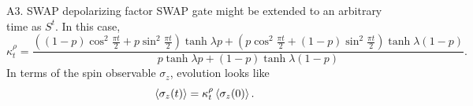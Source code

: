\begin{frame}{A3. SWAP depolarizing factor}
    SWAP gate might be extended to an arbitrary time as $S^{t}$. In this case, 
    \begin{equation*}
        \kappa_{t}^{\rho}=\frac{((1-p)\cos^{2}{\frac{\pi t}{2}}+p\sin^{2}{\frac{\pi t}{2}})\tanh{\lambda p}+(p\cos^{2}{\frac{\pi t}{2}}+(1-p)\sin^{2}{\frac{\pi t}{2}})\tanh{\lambda (1-p)}}{
          p\tanh{\lambda p}+(1-p)\tanh{\lambda (1-p)}}.
      \end{equation*}
      In terms of the spin observable $\sigma_{z}$, evolution looks like
\begin{equation}
  \expval{\sigma_{z}(t)}=\kappa_{t}^{\rho}\expval{\sigma_{z}(0)}.
\end{equation}
\end{frame}
